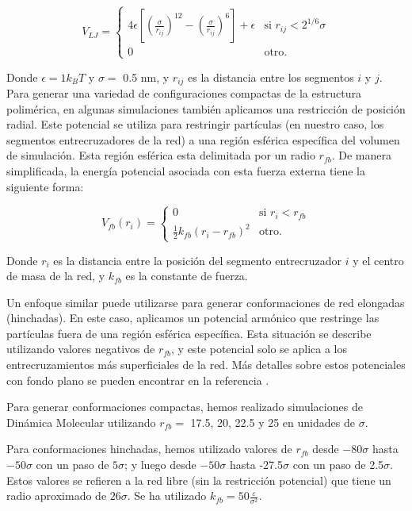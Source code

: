 \begin{equation}
	V_{LJ}=\begin{cases}
		4\epsilon \left[\left(\frac{\sigma}{r_{ij}}\right)^{12} - \left(\frac{\sigma}{r_{ij}}\right)^{6}\right] + \epsilon & \text{si $r_{ij} < 2^{1/6}\sigma$}\\
		0 & \text{otro}.
	\end{cases}
\end{equation}



Donde $\epsilon = 1 k_BT$ y $\sigma = $ 0.5 nm, y $r_{ij}$ es la distancia entre los segmentos $i$ y $j$.
Para generar una variedad de configuraciones compactas de la estructura polim\'erica, en algunas simulaciones tambi\'en aplicamos una restricci\'on de posici\'on radial.
Este potencial se utiliza para restringir part\'iculas (en nuestro caso, los segmentos entrecruzadores de la red) a una regi\'on esf\'erica espec\'ifica del volumen de simulaci\'on.
Esta regi\'on esf\'erica esta delimitada por un radio $r_{fb}$.
De manera simplificada, la energ\'ia potencial asociada con esta fuerza externa tiene la siguiente forma:

\begin{equation}
	V_{fb}(r_i)=\begin{cases}
		0 & \text{si $r_{i} < r_{fb}$}\\
		\frac{1}{2}k_{fb}\left(r_i -r_{fb}\right)^2 & \text{otro}.
	\end{cases}
\end{equation}


Donde $r_i$ es la distancia entre la posici\'on del segmento entrecruzador $i$ y el centro de masa de la red, y $k_{fb}$ es la constante de fuerza.

Un enfoque similar puede utilizarse para generar conformaciones de red elongadas (hinchadas). En este caso, aplicamos un potencial arm\'onico que restringe las part\'iculas fuera de una regi\'on esf\'erica espec\'ifica. Esta situaci\'on se describe utilizando valores negativos de $r_{fb}$, y este potencial solo se aplica a los entrecruzamientos m\'as superficiales de la red. M\'as detalles sobre estos potenciales con fondo plano se pueden encontrar en la referencia \cite{GROMACSRestraints}.

Para generar conformaciones compactas, hemos realizado simulaciones de Din\'amica Molecular utilizando $r_{fb} =$ 17.5, 20, 22.5 y 25 en unidades de $\sigma$.

Para conformaciones hinchadas, hemos utilizado valores de $r_{fb}$ desde $-80\sigma$ hasta $-50\sigma$ con un paso de $5\sigma$; y luego desde $-50\sigma$ hasta -27.5$\sigma$ con un paso de 2.5$\sigma$. Estos valores se refieren a la red libre (sin la restricci\'on potencial) que tiene un radio aproximado de $26\sigma$.
Se ha utilizado $k_{fb} = 50\frac{\varepsilon}{\sigma^2} $.



